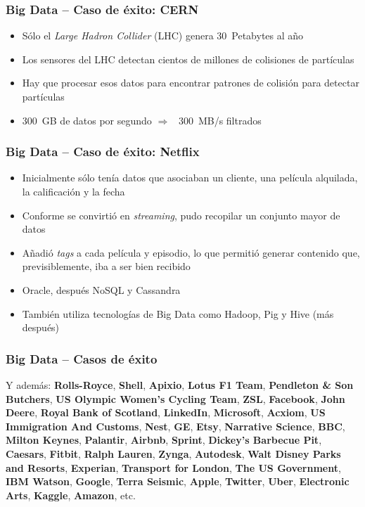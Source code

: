 \documentclass[14pt]{beamer}
\newcommand{\ra}{{\color{mdwrojo} $\Rightarrow${}~{}}}
\begin{document}
\begin{frame}[allowframebreaks]
  \frametitle{Big Data -- Caso de éxito: CERN}
\begin{itemize}
\item Sólo el {\em Large Hadron Collider} (LHC) genera 30~Petabytes al año
\item Los sensores del LHC detectan cientos de millones de colisiones de
  partículas
\item Hay que procesar esos datos para encontrar patrones de colisión para
  detectar partículas
\item 300~GB de datos por segundo \ra{} 300~MB/s filtrados
\end{itemize}
\end{frame}

\begin{frame}[allowframebreaks]
  \frametitle{Big Data -- Caso de éxito: Netflix}
\begin{itemize}
\item Inicialmente sólo tenía datos que asociaban un cliente, una película
  alquilada, la calificación y la fecha
\item Conforme se convirtió en {\em streaming}, pudo recopilar un conjunto
  mayor de datos
\item Añadió {\em tags\/} a cada película y episodio, lo que permitió
  generar contenido que, previsiblemente, iba a ser bien recibido
\item Oracle, después NoSQL y Cassandra
\item También utiliza tecnologías de Big Data como Hadoop, Pig y Hive (más
  después)
\end{itemize}
\end{frame}

\begin{frame}
  \frametitle{Big Data -- Casos de éxito}
  Y además: {\bf Rolls-Royce}, {\bf Shell}, {\bf Apixio}, {\bf Lotus F1
    Team}, {\bf Pendleton \& Son Butchers}, {\bf US Olympic Women’s Cycling
    Team}, {\bf ZSL}, {\bf Facebook}, {\bf John Deere}, {\bf Royal Bank of
    Scotland}, {\bf LinkedIn}, {\bf Microsoft}, {\bf Acxiom}, {\bf US
    Immigration And Customs}, {\bf Nest}, {\bf GE}, {\bf Etsy}, {\bf
    Narrative Science}, {\bf BBC}, {\bf Milton Keynes}, {\bf Palantir},
  {\bf Airbnb}, {\bf Sprint}, {\bf Dickey’s Barbecue Pit}, {\bf Caesars},
  {\bf Fitbit}, {\bf Ralph Lauren}, {\bf Zynga}, {\bf Autodesk}, {\bf Walt
    Disney Parks and Resorts}, {\bf Experian}, {\bf Transport for London},
  {\bf The US Government}, {\bf IBM Watson}, {\bf Google}, {\bf Terra
    Seismic}, {\bf Apple}, {\bf Twitter}, {\bf Uber}, {\bf Electronic
    Arts}, {\bf Kaggle}, {\bf Amazon}, etc.
\end{frame}
\end{document}
